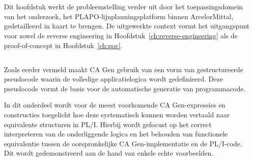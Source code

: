 
\chapter{}%
\label{ch:probleemanalyse}

Dit hoofdstuk werkt de probleemstelling verder uit door het toepassingsdomein van het onderzoek, het PLAPO-lijnplanningsplatform binnen ArcelorMittal, gedetailleerd in
kaart te brengen. De uitgewerkte context vormt het uitgangspunt voor zowel de reverse engineering in
Hoofdstuk~\ref{ch:reverse-engineering} als de proof-of-concept in Hoofdstuk~\ref{ch:poc}.

\section{}%
\label{sec:Syntax}
Zoals eerder vermeld maakt CA Gen gebruik van een vorm van gestructureerde pseudocode waarin de volledige applicatielogica wordt gedefinieerd. Deze pseudocode vormt de basis voor de automatische generatie van programmacode.

In dit onderdeel wordt voor de meest voorkomende CA Gen-expressies en constructies toegelicht hoe deze systematisch kunnen worden vertaald naar equivalente structuren in PL/I. Hierbij wordt gefocust op het correct interpreteren van de onderliggende logica en het behouden van functionele equivalentie tussen de oorspronkelijke CA Gen-implementatie en de PL/I-code. Dit wordt gedemonstreerd aan de hand van enkele echte voorbeelden.

